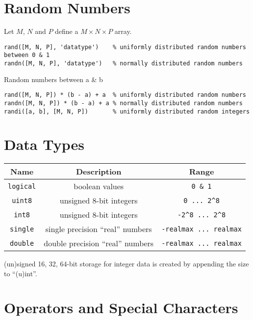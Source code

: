\documentclass{article}
\begin{document}
\lstset{language=Matlab, upquote=true}
%
\section*{Random Numbers}
Let $M$, $N$ and $P$ define a $M\times N\times P$ array.
\begin{lstlisting}
rand([M, N, P], 'datatype')    % uniformly distributed random numbers between 0 & 1
randn([M, N, P], 'datatype')   % normally distributed random numbers
\end{lstlisting}
Random numbers between a \& b
\begin{lstlisting}
rand([M, N, P]) * (b - a) + a  % uniformly distributed random numbers
randn([M, N, P]) * (b - a) + a % normally distributed random numbers
randi([a, b], [M, N, P])       % uniformly distributed random integers
\end{lstlisting}
\section*{Data Types}
\begin{table}[H]
    \centering
    \begin{tabular}{c | c | c}
        \toprule
        \textbf{Name}       & \textbf{Description}              & \textbf{Range}                   \\
        \midrule
        \lstinline!logical! & boolean values                    & \lstinline!0 & 1!                \\
        \lstinline!uint8!   & unsigned 8-bit integers           & \lstinline!0 ... 2^8!            \\
        \lstinline!int8!    & unsigned 8-bit integers           & \lstinline!-2^8 ... 2^8!         \\
        \lstinline!single!  & single precision ``real'' numbers & \lstinline!-realmax ... realmax! \\
        \lstinline!double!  & double precision ``real'' numbers & \lstinline!-realmax ... realmax! \\
        \bottomrule
    \end{tabular}
\end{table}
(un)signed 16, 32, 64-bit storage for integer data is created by appending the size to ``(u)int''.
\section*{Operators and Special Characters}
\end{document}
